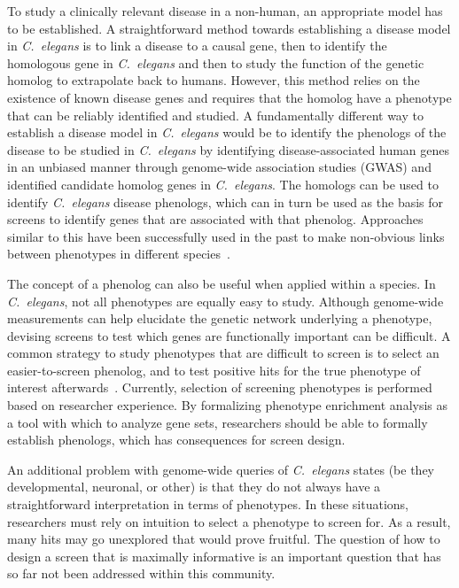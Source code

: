 \documentclass[10pt,letterpaper,twocolumn]{article}
\newcommand{\cel}{\emph{C.~elegans}}
\begin{document}
To study a clinically relevant disease in a non-human, an appropriate
model has to be established. A straightforward method towards establishing a
disease model in
\cel{} is to link a disease to a causal gene, then to identify the homologous
gene in \cel{} and then to study the function of the genetic homolog to
extrapolate back to humans. However, this method relies on the existence of
known disease genes and requires that the homolog have a phenotype that can be
reliably identified and studied. A fundamentally different way to establish a
disease model in \cel{} would be to identify the phenologs of the disease to be
studied in \cel{} by identifying disease-associated human genes in an unbiased
manner through genome-wide association studies (GWAS) and identified candidate
homolog genes in \cel{}. The homologs can be used to identify \cel{} disease
phenologs, which can in turn be used as the basis for screens to identify
genes that are associated with that phenolog. Approaches similar to this have
been successfully used in the past to make non-obvious links between phenotypes
in different species~\cite{}.

The concept of a phenolog can also be useful when applied within a species.
In \cel{}, not all phenotypes are equally easy to study. Although genome-wide
measurements can help elucidate the genetic network underlying a phenotype,
devising screens to test which genes are functionally important can be difficult.
A common strategy to study phenotypes that are difficult to screen is to
select an easier-to-screen phenolog, and to test positive hits for the true
phenotype of interest
afterwards~\cite{}. Currently, selection of screening phenotypes is
performed based on researcher experience.
By formalizing phenotype enrichment analysis as a tool with which to analyze
gene sets, researchers should be able to formally establish phenologs, which has
consequences for screen design.

An additional problem with genome-wide
queries of \cel{} states (be they developmental, neuronal, or other) is that
they do not
always have a straightforward interpretation in terms of phenotypes. In these
situations, researchers must rely on intuition to select a phenotype to screen
for. As a result, many hits may go unexplored that would prove fruitful. The
question of how to design a screen that is maximally informative is an important
question that has so far not been addressed within this community.
\end{document}
